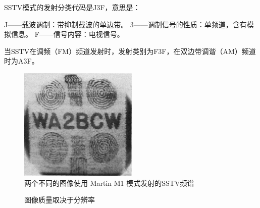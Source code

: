 SSTV模式的发射分类代码是J3F，意思是：

J——载波调制：带抑制载波的单边带。
3——调制信号的性质：单频道，含有模拟信息。
F——信号内容：电视信号。

当SSTV在调频（FM）频道发射时，发射类别为F3F，在双边带调谐（AM）频道时为A3F。

\begin{figure}
	\centering
	\includegraphics[width=0.7\linewidth]{figs/obrazek1.png}
	\caption{两个不同的图像使用 Martin M1 模式发射的SSTV频谱}
\end{figure}

\begin{figure}
	\centering
	\caption{图像质量取决于分辨率}
\end{figure}


